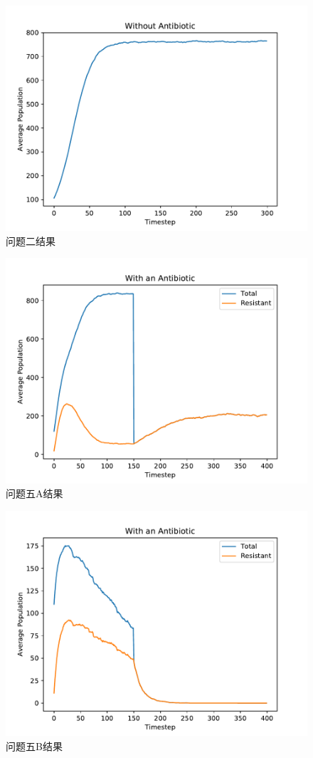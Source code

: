 \documentclass[logo,reportComp]{thesis}
\begin{document}
\begin{figure}[H]
\centering
\includegraphics[width=0.8\linewidth]{fig/p2.pdf}
\caption{问题二结果}
\label{fig:p2}
\end{figure}

\begin{figure}[H]
\centering
\includegraphics[width=0.8\linewidth]{fig/p5a.pdf}
\caption{问题五A结果}
\label{fig:p5a}
\end{figure}

\begin{figure}[H]
\centering
\includegraphics[width=0.8\linewidth]{fig/p5b.pdf}
\caption{问题五B结果}
\label{fig:p5b}
\end{figure}
\end{document}
